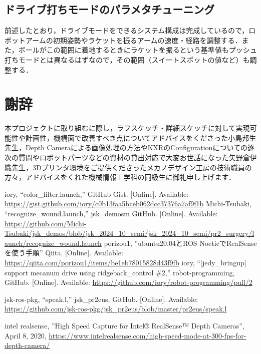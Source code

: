 \documentclass[10pt, oneside, titlepage]{ltjarticle}  %
\begin{document}
  \subsection{ドライブ打ちモードのパラメタチューニング}
  前述したとおり，ドライブモードをできるシステム構成は完成しているので，ロボットアームの初期姿勢やラケットを振るアームの速度・経路を調整する．また，ボールがこの範囲に着地するときにラケットを振るという基準値もプッシュ打ちモードとは異なるはずなので，その範囲（スイートスポットの値など）も調整する．

\section{謝辞}
本プロジェクトに取り組むに際し，ラフスケッチ・詳細スケッチに対して実現可能性や計画性，機構面で改善すべき点についてアドバイスをくださった小島邦生先生，Depth Cameraによる画像処理の方法やKXRのConfigurationについての逐次の質問やロボットパーツなどの資材の貸出対応で大変お世話になった矢野倉伊織先生，3Dプリンタ環境をご提供くださったメカノデザイン工房の技術職員の方々，アドバイスをくれた機械情報工学科の同級生に御礼申し上げます．


\begin{thebibliography}{9}
  iory, ``color\_filter.launch,'' GitHub Gist. [Online]. Available: 
  \url{https://gist.github.com/iory/c0b13faa5bceb062dcc37376a7af9f1b}
  Michi-Tsubaki, ``recognize\_wound.launch,'' jsk\_demosm GitHub. [Online]. Available: 
  \url{https://github.com/Michi-Tsubaki/jsk_demos/blob/jsk_2024_10_semi/jsk_2024_10_semi/pr2_surgery/launch/recognize_wound.launch}
  porizou1, ''ubuntu20.04とROS NoeticでRealSenseを使う手順'' Qiita. [Online]. Available: 
  \url{https://qiita.com/porizou1/items/be1eb78015828d43f9fb}
  iory, ``[jedy\_bringup] support mecanum drive using ridgeback\_control \#2,'' robot-programming, GitHub. [Online]. Available: 
  \url{https://github.com/iory/robot-programming/pull/2}

  jsk-ros-pkg, ``speak.l,'' jsk\_pr2eus, GitHub. [Online]. Available: 
  \url{https://github.com/jsk-ros-pkg/jsk_pr2eus/blob/master/pr2eus/speak.l}

  intel realsense, ''High Speed Capture for Intel® RealSense™ Depth Cameras'', April 8, 2020,
  \url{https://www.intelrealsense.com/high-speed-mode-at-300-fps-for-depth-camera/}
\end{thebibliography}

\dotfill
\end{document}
